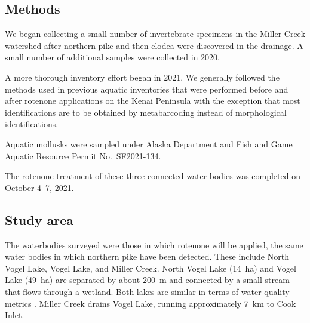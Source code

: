 \begin{multicols}{2}

\section{Methods}

We began collecting a small number of invertebrate specimens in the Miller Creek watershed after northern pike and then elodea were discovered in the drainage. A small number of additional samples were collected in 2020.

A more thorough inventory effort began in 2021. We generally followed the methods used in previous aquatic inventories that were performed before and after rotenone applications on the Kenai Peninsula \citep{Massengill2014, Massengill2017} with the exception that most identifications are to be obtained by metabarcoding instead of morphological identifications.

Aquatic mollusks were sampled under Alaska Department and Fish and Game Aquatic Resource Permit No.\ SF2021-134.

The rotenone treatment of these three connected water bodies was completed on October 4--7, 2021.

\subsection{Study area}

The waterbodies surveyed were those in which rotenone will be applied, the same water bodies in which northern pike have been detected. These include North Vogel Lake, Vogel Lake, and Miller Creek. North Vogel Lake (14~ha) and Vogel Lake (49~ha) are separated by about 200~m and connected by a small stream that flows through a wetland. Both lakes are similar in terms of water quality metrics \citep{Meyer2021}. Miller Creek drains Vogel Lake, running approximately 7~km to Cook Inlet.


\end{multicols}
